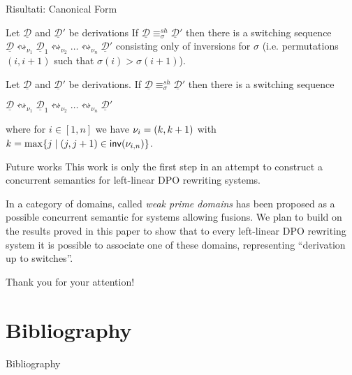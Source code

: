 \documentclass[usenames,dvipsnames]{beamer}
\newcommand{\shift}[1]{\ensuremath{\mathrel{{\leftrightsquigarrow}_{#1}}}}
\newcommand{\shifteq}[1][]{\ensuremath{\mathrel{{\equiv}^\mathit{sh}_{#1}}}}
\newcommand{\dder}[1]{\mathscr{#1}}
\newcommand{\inv}[1]{\mathsf{inv}({#1})}
\newcommand{\der}[1]{\underline{\dder{#1}}}
\begin{document}
\begin{frame}{Risultati: Canonical Form}\justifying
	
	\begin{theorem}
		Let $\der{D}$ and $\der{D}'$ be derivations If $\der{D} \shifteq[\sigma] \der{D}'$ then there is a switching sequence 
		$\der{D} \shift{\nu_1} \der{D}_1 \shift{\nu_2} \ldots
		\shift{\nu_n} \der{D}'$
		consisting only of inversions for $\sigma$ (i.e. permutations $(i, i+1)$ such that $\sigma(i)>\sigma(i+1)$).
	\end{theorem}
	
\begin{theorem}
	Let $\der{D}$ and $\der{D}'$ be derivations. If
	$\der{D} \shifteq[\sigma]\der{D}'$ then there is a switching sequence
	\begin{center}
		$\der{D} \shift{\nu_1} \der{D}_1 \shift{\nu_2} \ldots
		\shift{\nu_n} \der{D}'$
	\end{center}
	where for $i \in [1,n]$ we have $\nu_i  = \transp{k}$ with 
	$k = \max \{ j \mid \transp{j} \in \inv{\nu_{i,n}}\}$.
\end{theorem}
\end{frame}


\begin{frame}{Future works}\justifying 
	This work is only the first step in an attempt to construct a concurrent semantics for left-linear DPO rewriting systems.
	
	In \cite{baldan2017domains} a category of domains, called \emph{weak prime domains} has been proposed as a possible concurrent semantic for systems allowing fusions. We plan to build on the results proved in this paper to show that to every left-linear DPO rewriting system it is possible to associate one of these domains, representing ``derivation up to switches''.
\end{frame}

\begin{frame}{\hspace{1pt}}
	\LARGE
	\begin{center}
		Thank you for your attention!
	\end{center}
	
\end{frame}


\section{Bibliography}
\begin{frame}[allowframebreaks]{Bibliography}\justifying 
\printbibliography
\end{frame}
\end{document}
